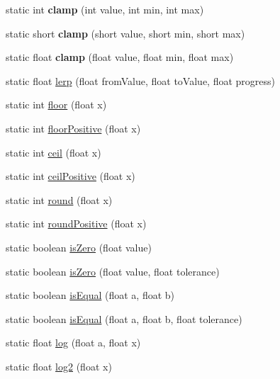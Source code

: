 \begin{DoxyCompactItemize}
\item 
\hypertarget{classairhockeyjava_1_1util_1_1_math_utils_af540386956891546f4fbedb3031c6013}{}static int {\bfseries clamp} (int value, int min, int max)\label{classairhockeyjava_1_1util_1_1_math_utils_af540386956891546f4fbedb3031c6013}

\item 
\hypertarget{classairhockeyjava_1_1util_1_1_math_utils_acfcaa772f3bf2899a62b8b73edf6c273}{}static short {\bfseries clamp} (short value, short min, short max)\label{classairhockeyjava_1_1util_1_1_math_utils_acfcaa772f3bf2899a62b8b73edf6c273}

\item 
\hypertarget{classairhockeyjava_1_1util_1_1_math_utils_a785244af65a8584c9e44ee480c06c5fd}{}static float {\bfseries clamp} (float value, float min, float max)\label{classairhockeyjava_1_1util_1_1_math_utils_a785244af65a8584c9e44ee480c06c5fd}

\item 
static float \hyperlink{classairhockeyjava_1_1util_1_1_math_utils_ae6f26968cda48d7c151998ae539fbb64}{lerp} (float from\+Value, float to\+Value, float progress)
\item 
static int \hyperlink{classairhockeyjava_1_1util_1_1_math_utils_af36abbd4c495b532bace02f853f87e54}{floor} (float x)
\item 
static int \hyperlink{classairhockeyjava_1_1util_1_1_math_utils_afd93ff7edc7d65356a9872e305704b55}{floor\+Positive} (float x)
\item 
static int \hyperlink{classairhockeyjava_1_1util_1_1_math_utils_af85dd4624a3fadb17ccf73e57a4a5198}{ceil} (float x)
\item 
static int \hyperlink{classairhockeyjava_1_1util_1_1_math_utils_a459f6060c34c753ab217d1ab5637152f}{ceil\+Positive} (float x)
\item 
static int \hyperlink{classairhockeyjava_1_1util_1_1_math_utils_a7225c523590a8dbd0019ced8275ed51d}{round} (float x)
\item 
static int \hyperlink{classairhockeyjava_1_1util_1_1_math_utils_a045c7bfa39f6dd5aa3bce0c5c06b1adb}{round\+Positive} (float x)
\item 
static boolean \hyperlink{classairhockeyjava_1_1util_1_1_math_utils_a616be280222ac706b2d9d4f3aa5d4ea6}{is\+Zero} (float value)
\item 
static boolean \hyperlink{classairhockeyjava_1_1util_1_1_math_utils_aa795f4ae8f4778c9a7e0cbad2f195ce0}{is\+Zero} (float value, float tolerance)
\item 
static boolean \hyperlink{classairhockeyjava_1_1util_1_1_math_utils_abf6e2f44552bf19dfa13131a03b3915d}{is\+Equal} (float a, float b)
\item 
static boolean \hyperlink{classairhockeyjava_1_1util_1_1_math_utils_a1c697ba1c785ec47ba1177c43da5a560}{is\+Equal} (float a, float b, float tolerance)
\item 
static float \hyperlink{classairhockeyjava_1_1util_1_1_math_utils_af932086f022e53eff94757d3d7bc6807}{log} (float a, float x)
\item 
static float \hyperlink{classairhockeyjava_1_1util_1_1_math_utils_ad5c747beae5688476edb9dd0a71f044b}{log2} (float x)
\end{DoxyCompactItemize}
